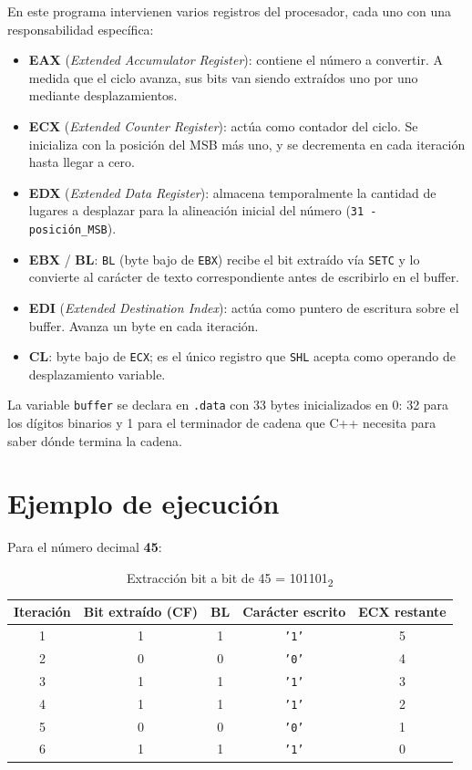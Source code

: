 \documentclass[12pt, letterpaper]{article}
\begin{document}
En este programa intervienen varios registros del procesador, cada uno con una responsabilidad específica:

\begin{itemize}
    \item \textbf{EAX} (\textit{Extended Accumulator Register}): contiene el número a convertir. A medida que el ciclo avanza, sus bits van siendo extraídos uno por uno mediante desplazamientos.
    \item \textbf{ECX} (\textit{Extended Counter Register}): actúa como contador del ciclo. Se inicializa con la posición del MSB más uno, y se decrementa en cada iteración hasta llegar a cero.
    \item \textbf{EDX} (\textit{Extended Data Register}): almacena temporalmente la cantidad de lugares a desplazar para la alineación inicial del número (\texttt{31 - posición\_MSB}).
    \item \textbf{EBX} / \textbf{BL}: \texttt{BL} (byte bajo de \texttt{EBX}) recibe el bit extraído vía \texttt{SETC} y lo convierte al carácter de texto correspondiente antes de escribirlo en el buffer.
    \item \textbf{EDI} (\textit{Extended Destination Index}): actúa como puntero de escritura sobre el buffer. Avanza un byte en cada iteración.
    \item \textbf{CL}: byte bajo de \texttt{ECX}; es el único registro que \texttt{SHL} acepta como operando de desplazamiento variable.
\end{itemize}

La variable \texttt{buffer} se declara en \texttt{.data} con 33 bytes inicializados en 0: 32 para los dígitos binarios y 1 para el terminador de cadena que C++ necesita para saber dónde termina la cadena.

\section{Ejemplo de ejecución}

Para el número decimal \textbf{45}:

\begin{table}[H]
    \centering
    \begin{tabular}{@{}ccccc@{}}
        \toprule
        \textbf{Iteración} & \textbf{Bit extraído (CF)} & \textbf{BL} & \textbf{Carácter escrito} & \textbf{ECX restante} \\
        \midrule
        1 & 1 & 1 & \texttt{'1'} & 5 \\
        2 & 0 & 0 & \texttt{'0'} & 4 \\
        3 & 1 & 1 & \texttt{'1'} & 3 \\
        4 & 1 & 1 & \texttt{'1'} & 2 \\
        5 & 0 & 0 & \texttt{'0'} & 1 \\
        6 & 1 & 1 & \texttt{'1'} & 0 \\
        \bottomrule
    \end{tabular}
    \caption{Extracción bit a bit de 45 = 101101\textsubscript{2}}
\end{table}
\end{document}
